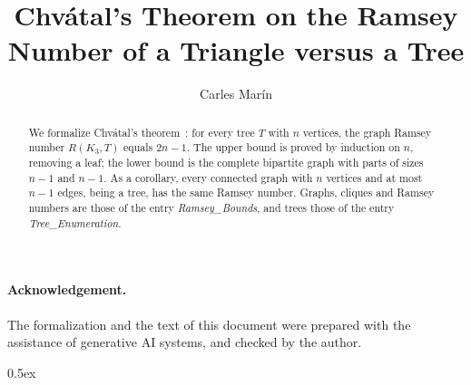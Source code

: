 \documentclass[10pt,a4paper]{article}
\begin{document}
\title{Chv\'atal's Theorem on the Ramsey Number of a Triangle versus a Tree}
\author{Carles Mar\'in}
\maketitle

\begin{abstract}
We formalize Chv\'atal's theorem~\cite{Chvatal1977}: for every tree $T$ with $n$ vertices, the graph Ramsey number $R(K_3,T)$ equals $2n-1$. The upper bound is proved by induction on $n$, removing a leaf; the lower bound is the complete bipartite graph with parts of sizes $n-1$ and $n-1$. As a corollary, every connected graph with $n$ vertices and at most $n-1$ edges, being a tree, has the same Ramsey number. Graphs, cliques and Ramsey numbers are those of the entry \emph{Ramsey\_Bounds}, and trees those of the entry \emph{Tree\_Enumeration}.
\end{abstract}

\paragraph{Acknowledgement.} The formalization and the text of this document were prepared with the
assistance of generative AI systems, and checked by the author.

\tableofcontents

\parindent 0pt\parskip 0.5ex





\end{document}
